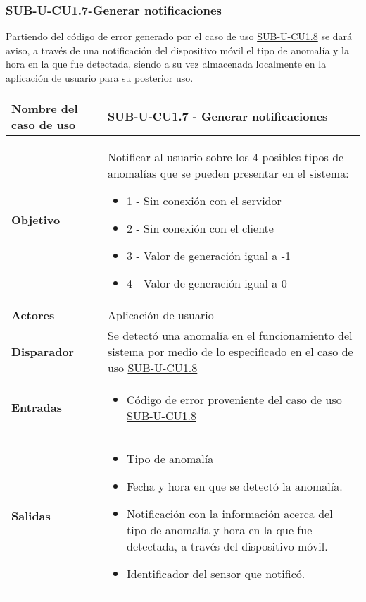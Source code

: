 \subsubsection{SUB-U-CU1.7-Generar notificaciones}\label{SUB-U-CU1.7}
Partiendo del código de error generado por el caso de uso \hyperref[SUB-U-CU1.8]{SUB-U-CU1.8} se dará aviso, a través de una notificación del dispositivo móvil el tipo de anomalía y la hora en la que fue detectada, siendo a su vez almacenada localmente en la aplicación de usuario para su posterior uso.  
\begin{longtable}{|J{5cm}|J{10.3cm}|}
	\hline
	\textbf{Nombre del caso de uso} &
		SUB-U-CU1.7 - Generar notificaciones
 \\ \hline
	\textbf{Objetivo} &
		Notificar al usuario sobre los 4 posibles tipos de anomalías que  se pueden presentar en el sistema:
		\begin{itemize}
			\item 1 - Sin conexión con el servidor
			\item 2 - Sin conexión con el cliente
			\item 3 - Valor de generación igual a -1
			\item 4 - Valor de generación igual a 0
		\end{itemize} \\ \hline
	\textbf{Actores} &
		Aplicación de usuario \\ \hline 
	\textbf{Disparador} & 
		Se detectó una anomalía en el funcionamiento del sistema por medio de lo especificado en el caso de uso \hyperref[SUB-U-CU1.8]{SUB-U-CU1.8}  \\ \hline
	\textbf{Entradas} & 
		\begin{itemize}
				\item Código de error proveniente del caso de uso \hyperref[SUB-U-CU1.8]{SUB-U-CU1.8}
		\end{itemize}\\ \hline 
	\textbf{Salidas} & 
		\begin{itemize}
		    \item Tipo de anomalía
			\item Fecha y hora en que se detectó la anomalía.
			\item Notificación con la información acerca del tipo de anomalía y hora en la que fue detectada, a través del dispositivo móvil.
			\item Identificador del sensor que notificó.
		\end{itemize} \\ \hline

\end{longtable}
